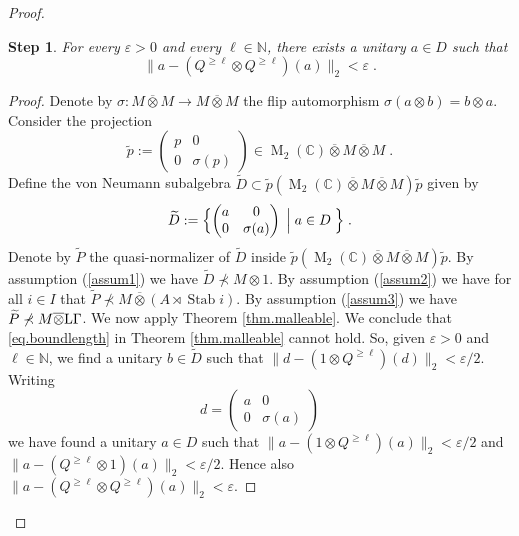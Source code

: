 \documentclass[a4paper,11pt]{amsart}
\numberwithin{equation}{section}
\newtheorem{step}{Step}[section]
\begin{document}
\begin{proof}
\begin{step}\label{stepa}
For every ${\varepsilon} > 0$ and every $\ell \in {\mathbb{N}}$, there exists a unitary $a \in D$ such that $$\|a - (Q^{{{\scriptscriptstyle\geqslant}} \ell} {\otimes} Q^{{{\scriptscriptstyle\geqslant}} \ell})(a)\|_2 < {\varepsilon} \; .$$
\end{step}
\begin{proof}
Denote by ${\sigma} : M {\mathbin{\overline{\otimes}}} M {\rightarrow} M {\mathbin{\overline{\otimes}}} M$ the flip automorphism ${\sigma}(a {\otimes} b) = b {\otimes} a$. Consider the projection
$${\widetilde{p}} := \begin{pmatrix} p & 0 \\ 0 & {\sigma}(p) \end{pmatrix} \in {\operatorname{M}}_2({\mathbb{C}}) {\mathbin{\overline{\otimes}}} M {\mathbin{\overline{\otimes}}} M \; .$$
Define the von Neumann subalgebra ${\widetilde{D}} \subset {\widetilde{p}}({\operatorname{M}}_2({\mathbb{C}}) {\mathbin{\overline{\otimes}}} M {\mathbin{\overline{\otimes}}} M) {\widetilde{p}}$ given by
$${\widetilde{D}} := \Bigl\{ \begin{pmatrix} a & 0 \\ 0 & {\sigma}(a) \end{pmatrix} \; \Big| \; a \in D \; \Bigr\} \; .$$
Denote by ${\widetilde{P}}$ the quasi-normalizer of ${\widetilde{D}}$ inside ${\widetilde{p}} ({\operatorname{M}}_2({\mathbb{C}}) {\mathbin{\overline{\otimes}}} M {\mathbin{\overline{\otimes}}} M) {\widetilde{p}}$. By assumption (\ref{assum1}) we have ${\widetilde{D}} \not\prec M {\otimes} 1$. By assumption (\ref{assum2}) we have for all $i \in I$ that ${\widetilde{P}} \not\prec M {\mathbin{\overline{\otimes}}} (A \rtimes {\operatorname{Stab}} i)$. By assumption (\ref{assum3}) we have ${\widetilde{P}} \not\prec M {\mathbin{\overline{\otimes}}} {\mathord{\text{\rm L}}} \Gamma$. We now apply Theorem \ref{thm.malleable}. We conclude that \eqref{eq.boundlength} in Theorem \ref{thm.malleable} cannot hold. So, given ${\varepsilon} > 0$ and $\ell \in {\mathbb{N}}$, we find a unitary $b \in {\widetilde{D}}$ such that $\|d - (1 {\otimes} Q^{{{\scriptscriptstyle\geqslant}} \ell})(d)\|_2 < {\varepsilon} / 2$. Writing
$$d = \begin{pmatrix} a & 0 \\ 0 & {\sigma}(a) \end{pmatrix}$$
we have found a unitary $a \in D$ such that $\|a - (1 {\otimes} Q^{{{\scriptscriptstyle\geqslant}} \ell})(a)\|_2 < {\varepsilon} / 2$ and $\|a - (Q^{{{\scriptscriptstyle\geqslant}} \ell} {\otimes} 1)(a)\|_2 < {\varepsilon} / 2$. Hence also
$\|a - (Q^{{{\scriptscriptstyle\geqslant}} \ell} {\otimes} Q^{{{\scriptscriptstyle\geqslant}} \ell})(a)\|_2 < {\varepsilon}$.
\end{proof}


\end{proof}
\end{document}
